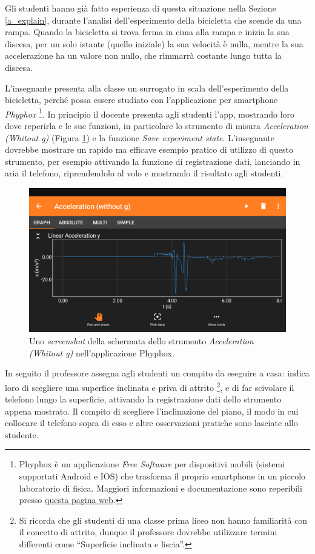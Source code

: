 \documentclass{report} \usepackage[T1]{fontenc} \usepackage[italian]{babel}
\begin{document}
Gli studenti hanno già fatto esperienza di questa situazione nella Sezione
\ref{a_explain}, durante l'analisi dell'esperimento della bicicletta che
scende da una rampa. Quando la bicicletta si trova ferma in cima alla rampa
e inizia la sua discesa, per un solo istante (quello iniziale) la sua velocità
è nulla, mentre la sua accelerazione ha un valore non nullo, che rimmarrà costante
lungo tutta la discesa.

L'insegnante presenta alla classe un surrogato in scala dell'esperimento della
bicicletta, perché possa essere studiato con l'applicazione per smartphone
\emph{Phyphox}
\footnote{
          Phyphox è un applicazione \emph{Free Software} per dispositivi mobili
          (sistemi supportati Android e IOS) che trasforma il proprio
          smartphone in un piccolo laboratorio di fisica. Maggiori
          informazioni e documentazione sono reperibili presso
          \textcolor{blue}{\href{https://phyphox.org/}{questa pagina web}}.
         }.
In principio il docente presenta agli studenti l'app, mostrando loro dove
reperirla e le sue funzioni, in particolare lo strumento di misura
\emph{Acceleration (Whitout g)} (Figura \ref{fig:phyphox}) e la funzione
\emph{Save experiment state}.
L'insegnante dovrebbe mostrare un rapido ma efficave esempio pratico
di utilizzo di questo strumento, per esempio attivando la funzione
di registrazione dati, lanciando in aria il telefono, riprendendolo
al volo e mostrando il risultato agli studenti.
\begin{figure}[H]
\centering
  \includegraphics[width=\textwidth]{phyphox}
  \caption{Uno \emph{screenshot} della schermata dello strumento
           \emph{Acceleration (Whitout g)}
           nell'applicazione Phyphox.}
  \label{fig:phyphox}
\end{figure}
In seguito il professore assegna agli studenti un compito da eseguire
a casa: indica loro di scegliere una superfice inclinata
e priva di attrito
\footnote{
          Si ricorda che gli studenti di una classe prima liceo
          non hanno familiarità con il concetto di attrito,
          dunque il professore dovrebbe utilizzare termini differenti
          come ``Superficie inclinata e liscia''.
         },
e di far scivolare il telefono lungo la superficie, attivando
la registrazione dati dello strumento appena mostrato.
Il compito di scegliere l'inclinazione del piano, il modo in cui
collocare il telefono sopra di esso e altre osservazioni pratiche
sono lasciate allo studente.
\end{document}
